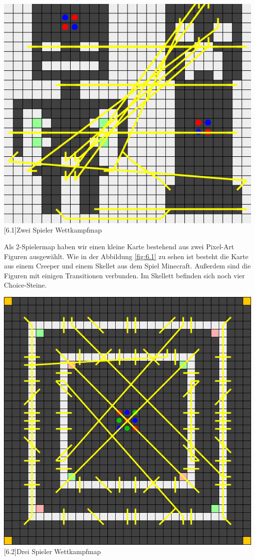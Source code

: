 \documentclass[12pt,a4paper,bibliography=totocnumbered,listof=totocnumbered]{scrartcl}
\begin{document}
	
	\vspace{1em}
	\begin{minipage}{\linewidth}
		\centering
		\includegraphics[width=0.66\linewidth]{pics/Kapitel_6/CreeperMap.png}
		[6.1]{Zwei Spieler Wettkampfmap}
		\label{fig:6.1}
	\end{minipage}
	\vspace{1em}
	
	Als 2-Spielermap haben wir einen kleine Karte bestehend aus zwei Pixel-Art Figuren ausgewählt. Wie in der Abbildung \ref{fig:6.1} zu sehen ist besteht die Karte aus einem Creeper und einem Skellet aus dem Spiel Minecraft. Außerdem sind die Figuren mit einigen Transitionen verbunden. Im Skellett befinden sich noch vier Choice-Steine.
	
	\vspace{1em}
	\begin{minipage}{\linewidth}
		\centering
		\includegraphics[width=0.66\linewidth]{pics/Kapitel_6/DreiSpielerKreise.png}
		[6.2]{Drei Spieler Wettkampfmap}
		\label{fig:6.2}
	\end{minipage}
	\vspace{1em}
	
\end{document}
